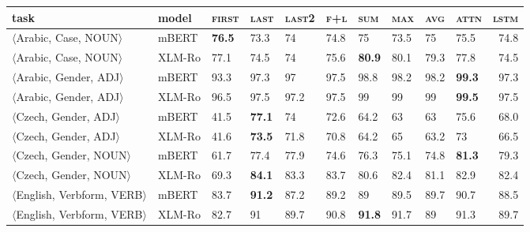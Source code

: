 \begin{tabular}{llllllllllr}
\toprule
                 \textbf{task} & \textbf{model} & \textsc{first} & \textsc{last} & \textsc{last2} & \textsc{f+l} & \textsc{sum} & \textsc{max} & \textsc{avg} & \textsc{attn} &  \textsc{lstm} \\
\midrule
      $\langle$Arabic, Case, NOUN$\rangle$ &          mBERT &     \textbf{76.5} &          73.3 &             74 &         74.8 &           75 &         73.5 &           75 &          75.5 &           74.8 \\
      $\langle$Arabic, Case, NOUN$\rangle$ &         XLM-Ro &           77.1 &          74.5 &             74 &         75.6 &   \textbf{80.9} &         80.1 &         79.3 &          77.8 &           74.5 \\
     $\langle$Arabic, Gender, ADJ$\rangle$ &          mBERT &           93.3 &          97.3 &             97 &         97.5 &         98.8 &         98.2 &         98.2 &    \textbf{99.3} &           97.3 \\
     $\langle$Arabic, Gender, ADJ$\rangle$ &         XLM-Ro &           96.5 &          97.5 &           97.2 &         97.5 &           99 &           99 &           99 &    \textbf{99.5} &           97.5 \\
      $\langle$Czech, Gender, ADJ$\rangle$ &          mBERT &           41.5 &    \textbf{77.1} &             74 &         72.6 &         64.2 &           63 &           63 &          75.6 &           68.0 \\
      $\langle$Czech, Gender, ADJ$\rangle$ &         XLM-Ro &           41.6 &    \textbf{73.5} &           71.8 &         70.8 &         64.2 &           65 &         63.2 &            73 &           66.5 \\
     $\langle$Czech, Gender, NOUN$\rangle$ &          mBERT &           61.7 &          77.4 &           77.9 &         74.6 &         76.3 &         75.1 &         74.8 &    \textbf{81.3} &           79.3 \\
     $\langle$Czech, Gender, NOUN$\rangle$ &         XLM-Ro &           69.3 &    \textbf{84.1} &           83.3 &         83.7 &         80.6 &         82.4 &         81.1 &          82.9 &           82.4 \\
 $\langle$English, Verbform, VERB$\rangle$ &          mBERT &           83.7 &    \textbf{91.2} &           87.2 &         89.2 &           89 &         89.5 &         89.7 &          90.7 &           88.5 \\
 $\langle$English, Verbform, VERB$\rangle$ &         XLM-Ro &           82.7 &            91 &           89.7 &         90.8 &   \textbf{91.8} &         91.7 &           89 &          91.3 &           89.7 \\

\end{tabular}
